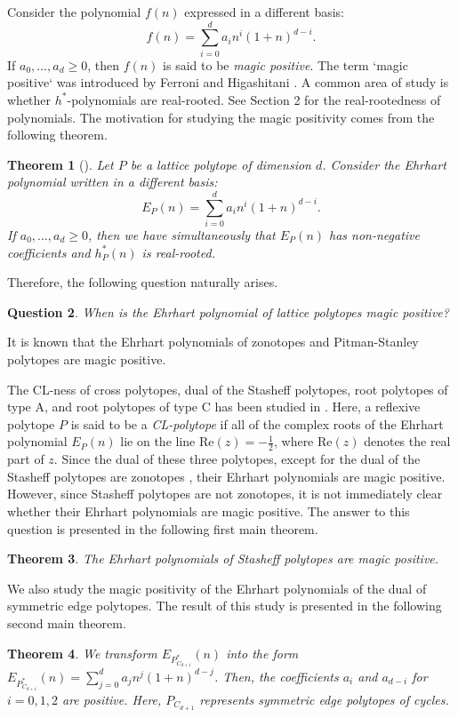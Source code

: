 \documentclass[a4paper,reqno,11pt, oneside]{amsart}
\newtheorem{thm}{Theorem}[section]
\newtheorem{q}[thm]{Question}
\theoremstyle{definition}
\theoremstyle{remark}
\begin{document}
Consider the polynomial $f(n)$ expressed in a different basis:
$$f(n) = \sum_{i=0}^d a_i n^i (1+n)^{d-i}.$$
If $a_0,\ldots,a_d\geq 0$, then $f(n)$ is said to be \textit{magic positive}. The term `magic positive` was introduced by Ferroni and Higashitani \cite{FH}. A common area of study is whether $h^\ast$-polynomials are real-rooted. See Section 2 for the real-rootedness of polynomials. The motivation for studying the magic positivity comes from the following theorem.

\begin{thm}[{\cite[Theorem 4.19]{FH}}]
Let $P$ be a lattice polytope of dimension $d$. Consider the Ehrhart polynomial written in a different basis:
$$E_P(n) = \sum_{i=0}^d a_i n^i (1+n)^{d-i}.$$
If $a_0,\ldots,a_d\geq 0$, then we have simultaneously that $E_P(n)$ has non-negative coefficients and $h^*_P(n)$ is real-rooted.
\end{thm}

Therefore, the following question naturally arises.
\begin{q}
When is the Ehrhart polynomial of lattice polytopes magic positive?
\end{q}
It is known that the Ehrhart polynomials of zonotopes \cite{BJM} and Pitman-Stanley polytopes \cite{FAM} are magic positive.

The CL-ness of cross polytopes, dual of the Stasheff polytopes, root polytopes of type A, and root polytopes of type C has been studied in \cite{HKM}. Here, a reflexive polytope $P$ is said to be a \textit{CL-polytope} if all of the complex roots of the Ehrhart polynomial $E_P(n)$ lie on the line $\mathrm{Re}(z) = -\frac{1}{2}$, where $\mathrm{Re}(z)$ denotes the real part of $z$. Since the dual of these three polytopes, except for the dual of the Stasheff polytopes are zonotopes \cite{CM}, their Ehrhart polynomials are magic positive. However, since Stasheff polytopes are not zonotopes, it is not immediately clear whether their Ehrhart polynomials are magic positive. The answer to this question is presented in the following first main theorem. 
\begin{thm}\label{main1}
The Ehrhart polynomials of Stasheff polytopes are magic positive.
\end{thm}

We also study the magic positivity of the Ehrhart polynomials of the dual of symmetric edge polytopes. The result of this study is presented in the following second main theorem.
\begin{thm}\label{main2}
We transform $E_{P_{C_{d+1}}^\ast}(n)$ into the form $E_{P_{C_{d+1}}^\ast}(n) = \sum _{j=0}^da_jn^j(1+n)^{d-j}$. Then, the coefficients $a_i$ and $ a_{d-i}$ for $i = 0, 1, 2$ are positive. Here, $P_{C_{d+1}}$ represents symmetric edge polytopes of cycles.
\end{thm}
\end{document}

